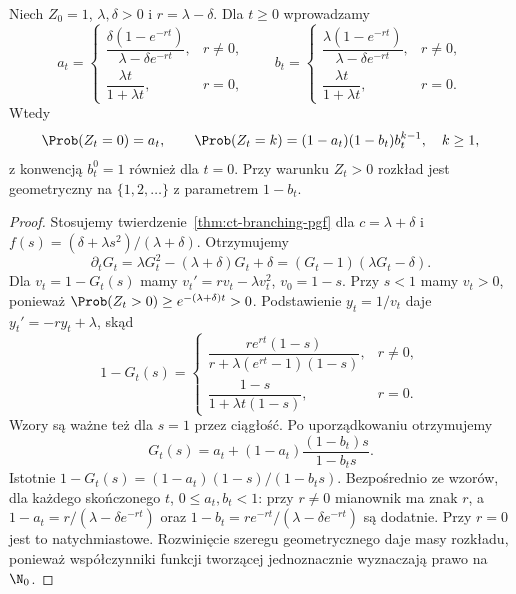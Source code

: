 \begin{twierdzenie}
\label{thm:bd-explicit-law}
Niech $Z_0=1$, $\lambda,\delta>0$ i
$r=\lambda-\delta$.
Dla $t\ge0$ wprowadzamy
\[
a_t=\begin{cases}
\dfrac{\delta(1-e^{-rt})}{\lambda-\delta e^{-rt}},&r\ne0,\\[6pt]
\dfrac{\lambda t}{1+\lambda t},&r=0,
\end{cases}
\qquad
b_t=\begin{cases}
\dfrac{\lambda(1-e^{-rt})}{\lambda-\delta e^{-rt}},&r\ne0,\\[6pt]
\dfrac{\lambda t}{1+\lambda t},&r=0.
\end{cases}
\]
Wtedy
\[
\Prob(Z_t=0)=a_t,\qquad
\Prob(Z_t=k)=(1-a_t)(1-b_t)b_t^{k-1},\quad k\ge1,
\]
z konwencją $b_t^0=1$ również dla $t=0$.
Przy warunku $Z_t>0$ rozkład jest geometryczny
na $\{1,2,\ldots\}$ z parametrem $1-b_t$.
\end{twierdzenie}
\begin{proof}
Stosujemy twierdzenie~\ref{thm:ct-branching-pgf}
dla $c=\lambda+\delta$ i
$f(s)=(\delta+\lambda s^2)/(\lambda+\delta)$.
Otrzymujemy
\[
\partial_t G_t=\lambda G_t^2-(\lambda+\delta)G_t+\delta
=(G_t-1)(\lambda G_t-\delta).
\]
Dla $v_t=1-G_t(s)$ mamy
$v_t'=rv_t-\lambda v_t^2$, $v_0=1-s$.
Przy $s<1$ mamy $v_t>0$, ponieważ
$\Prob(Z_t>0)\ge e^{-(\lambda+\delta)t}>0$.
Podstawienie $y_t=1/v_t$ daje
$y_t'=-ry_t+\lambda$, skąd
\[
1-G_t(s)=
\begin{cases}
\dfrac{r e^{rt}(1-s)}{r+\lambda(e^{rt}-1)(1-s)},&r\ne0,\\[6pt]
\dfrac{1-s}{1+\lambda t(1-s)},&r=0.
\end{cases}
\]
Wzory są ważne też dla $s=1$ przez ciągłość.
Po uporządkowaniu otrzymujemy
\[
G_t(s)=a_t+(1-a_t)\frac{(1-b_t)s}{1-b_ts}.
\]
Istotnie $1-G_t(s)=(1-a_t)(1-s)/(1-b_ts)$.
Bezpośrednio ze wzorów, dla każdego skończonego $t$,
$0\le a_t,b_t<1$: przy $r\ne0$ mianownik
ma znak $r$, a $1-a_t=r/(\lambda-\delta e^{-rt})$
oraz $1-b_t=r e^{-rt}/(\lambda-\delta e^{-rt})$
są dodatnie. Przy $r=0$ jest to natychmiastowe.
Rozwinięcie szeregu geometrycznego daje masy
rozkładu, ponieważ współczynniki funkcji tworzącej
jednoznacznie wyznaczają prawo na $\N_0$.
\end{proof}

